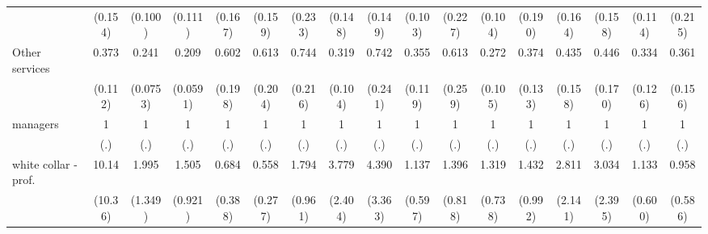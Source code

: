 {\begin{tabular}{l*{16}{c}}
                    &     (0.154)         &     (0.100)         &     (0.111)         &     (0.167)         &     (0.159)         &     (0.233)         &     (0.148)         &     (0.149)         &     (0.103)         &     (0.227)         &     (0.104)         &     (0.190)         &     (0.164)         &     (0.158)         &     (0.114)         &     (0.215)         \\
[1em]
Other services      &       0.373\sym{***}&       0.241\sym{***}&       0.209\sym{***}&       0.602         &       0.613         &       0.744         &       0.319\sym{***}&       0.742         &       0.355\sym{**} &       0.613         &       0.272\sym{***}&       0.374\sym{**} &       0.435\sym{*}  &       0.446\sym{*}  &       0.334\sym{**} &       0.361\sym{*}  \\
                    &     (0.112)         &    (0.0753)         &    (0.0591)         &     (0.198)         &     (0.204)         &     (0.216)         &     (0.104)         &     (0.241)         &     (0.119)         &     (0.259)         &     (0.105)         &     (0.133)         &     (0.158)         &     (0.170)         &     (0.126)         &     (0.156)         \\
[1em]
managers            &           1         &           1         &           1         &           1         &           1         &           1         &           1         &           1         &           1         &           1         &           1         &           1         &           1         &           1         &           1         &           1         \\
                    &         (.)         &         (.)         &         (.)         &         (.)         &         (.)         &         (.)         &         (.)         &         (.)         &         (.)         &         (.)         &         (.)         &         (.)         &         (.)         &         (.)         &         (.)         &         (.)         \\
[1em]
white collar - prof.&       10.14\sym{*}  &       1.995         &       1.505         &       0.684         &       0.558         &       1.794         &       3.779\sym{*}  &       4.390         &       1.137         &       1.396         &       1.319         &       1.432         &       2.811         &       3.034         &       1.133         &       0.958         \\
                    &     (10.36)         &     (1.349)         &     (0.921)         &     (0.388)         &     (0.277)         &     (0.961)         &     (2.404)         &     (3.363)         &     (0.597)         &     (0.818)         &     (0.738)         &     (0.992)         &     (2.141)         &     (2.395)         &     (0.600)         &     (0.586)         \\

\end{tabular}}
